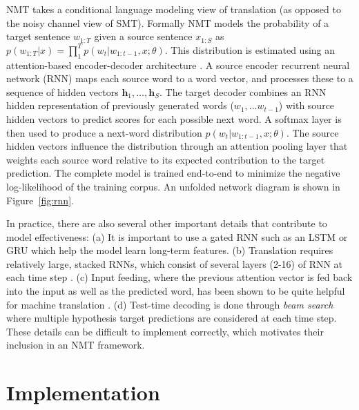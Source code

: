 \documentclass[11pt]{article}
\begin{document}
NMT takes a conditional language modeling view of translation (as
opposed to the noisy channel view of SMT). Formally NMT models the
probability of a target sentence $w_{1:T}$ given a source sentence
$x_{1:S}$ as
$p(w_{1:T}| x) = \prod_{1}^T p(w_t| w_{1:t-1}, x; \theta)$. This
distribution is estimated using an attention-based encoder-decoder
architecture \cite{Bahdanau2015}. A source encoder recurrent neural
network (RNN) maps each source word to a word vector, and processes
these to a sequence of hidden vectors
$\mathbf{h}_1, \ldots, \mathbf{h}_S$.  The target decoder combines an
RNN hidden representation of previously generated words
($w_1, ... w_{t-1}$) with source hidden vectors to predict scores for
each possible next word. A softmax layer is then used to produce a
next-word distribution $ p(w_t| w_{1:t-1}, x; \theta)$. The source
hidden vectors influence the distribution through an attention pooling
layer that weights each source word relative to its expected
contribution to the target prediction. The complete model is trained
end-to-end to minimize the negative log-likelihood of the training
corpus. An unfolded network diagram is shown in Figure~\ref{fig:rnn}.


In practice, there are also several other important details that
contribute to model effectiveness: (a) It is important to use a gated
RNN such as an LSTM \cite{hochreiter1997long} or GRU
\cite{chung2014empirical} which help the model learn long-term
features. (b) Translation requires relatively large, stacked RNNs,
which consist of several layers (2-16) of RNN at each time step
\cite{sutskever14sequence}. (c) Input feeding, where the previous
attention vector is fed back into the input as well as the predicted
word, has been shown to be quite helpful for machine translation
\cite{Luong2015}.  (d) Test-time decoding is done through \textit{beam
  search} where multiple hypothesis target predictions are considered
at each time step. These details can be difficult to implement correctly, which motivates their inclusion in an NMT framework.






\section{Implementation}
\end{document}
